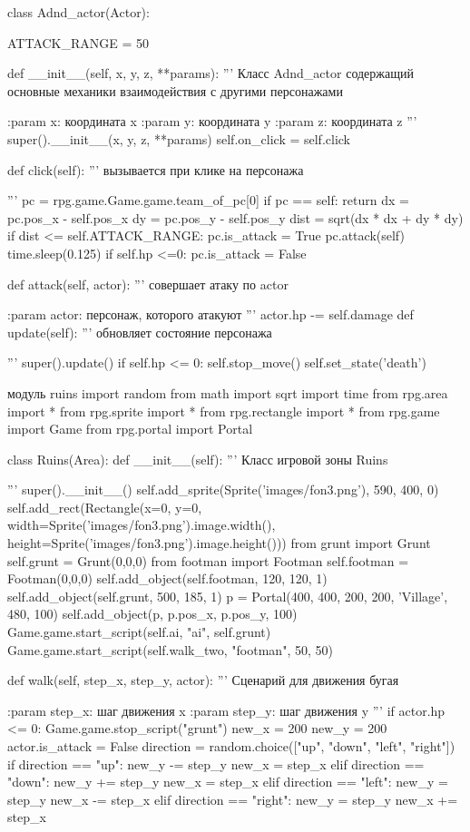 class Adnd\_actor(Actor):

ATTACK\_RANGE = 50

def \_\_init\_\_(self, x, y, z, **params):
'''
Класс Adnd\_actor содержащий основные механики взаимодействия с другими персонажами

:param x: координата x
:param y: координата y
:param z: координата z
'''
super().\_\_init\_\_(x, y, z, **params)
self.on\_click = self.click

def click(self):
'''
вызывается при клике на персонажа

'''
pc = rpg.game.Game.game.team\_of\_pc[0]
if pc == self:
return
dx = pc.pos\_x - self.pos\_x
dy = pc.pos\_y - self.pos\_y
dist = sqrt(dx * dx + dy * dy)
if dist <= self.ATTACK\_RANGE:
pc.is\_attack = True
pc.attack(self)
time.sleep(0.125)
if self.hp <=0:
pc.is\_attack = False

def attack(self, actor):
'''
совершает атаку по actor

:param actor: персонаж, которого атакуют
'''
actor.hp -= self.damage
def update(self):
'''
обновляет состояние персонажа

'''
super().update()
if self.hp <= 0:
self.stop\_move()
self.set\_state('death')

модуль ruins
import random
from math import sqrt
import time
from rpg.area import *
from rpg.sprite import *
from rpg.rectangle import *
from rpg.game import Game
from rpg.portal import Portal

class Ruins(Area):
def \_\_init\_\_(self):
'''
Класс игровой зоны Ruins

'''
super().\_\_init\_\_()
self.add\_sprite(Sprite('images/fon3.png'), 590, 400, 0)
self.add\_rect(Rectangle(x=0, y=0, width=Sprite('images/fon3.png').image.width(), height=Sprite('images/fon3.png').image.height()))
from grunt import Grunt
self.grunt = Grunt(0,0,0)
from footman import Footman
self.footman = Footman(0,0,0)
self.add\_object(self.footman, 120, 120, 1)
self.add\_object(self.grunt, 500, 185, 1)
p = Portal(400, 400, 200, 200, 'Village', 480, 100)
self.add\_object(p, p.pos\_x, p.pos\_y, 100)
Game.game.start\_script(self.ai, "ai", self.grunt)
Game.game.start\_script(self.walk\_two, "footman", 50, 50)


def walk(self, step\_x, step\_y, actor):
'''
Сценарий для движения бугая

:param step\_x: шаг движения x
:param step\_y: шаг движения y
'''
if actor.hp <= 0:
Game.game.stop\_script("grunt")
new\_x = 200
new\_y = 200
actor.is\_attack = False
direction = random.choice(["up", "down", "left", "right"])
if direction == "up":
new\_y -= step\_y
new\_x = step\_x
elif direction == "down":
new\_y += step\_y
new\_x = step\_x
elif direction == "left":
new\_y = step\_y
new\_x -= step\_x
elif direction == "right":
new\_y = step\_y
new\_x += step\_x


